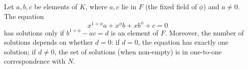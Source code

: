 Let $a, b, c$ be elements of $K$, where $a, c$ lie in $F$ (the fixed field of $\phi$) and $a \neq 0$. The equation
$$x^{1+\phi}a + x^{\phi}b + x b^{\phi} + c = 0 \tag{*}$$
has solutions only if $b^{1+\phi} - ac = d$ is an element of $F$. Moreover, the number of solutions depends on whether $d = 0$: if $d = 0$, the equation has exactly one solution; if $d \neq 0$, the set of solutions (when non-empty) is in one-to-one correspondence with $N$.
